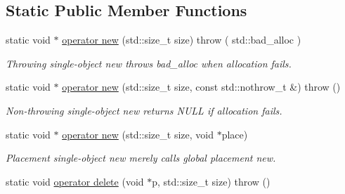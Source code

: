 \subsection*{Static Public Member Functions}
\begin{DoxyCompactItemize}
\item 
\hypertarget{classLoki_1_1SmallObjectBase_a39f9c8d5b17c09bece34c8a400981970}{}static void $\ast$ \hyperlink{classLoki_1_1SmallObjectBase_a39f9c8d5b17c09bece34c8a400981970}{operator new} (std\+::size\+\_\+t size)  throw ( std\+::bad\+\_\+alloc )\label{classLoki_1_1SmallObjectBase_a39f9c8d5b17c09bece34c8a400981970}

\begin{DoxyCompactList}\small\item\em Throwing single-\/object new throws bad\+\_\+alloc when allocation fails. \end{DoxyCompactList}\item 
\hypertarget{classLoki_1_1SmallObjectBase_ad212efa68b48292bf8fd2dd158b49400}{}static void $\ast$ \hyperlink{classLoki_1_1SmallObjectBase_ad212efa68b48292bf8fd2dd158b49400}{operator new} (std\+::size\+\_\+t size, const std\+::nothrow\+\_\+t \&)  throw ()\label{classLoki_1_1SmallObjectBase_ad212efa68b48292bf8fd2dd158b49400}

\begin{DoxyCompactList}\small\item\em Non-\/throwing single-\/object new returns N\+U\+L\+L if allocation fails. \end{DoxyCompactList}\item 
\hypertarget{classLoki_1_1SmallObjectBase_adbbe1bde0960a38502af0940004d942f}{}static void $\ast$ \hyperlink{classLoki_1_1SmallObjectBase_adbbe1bde0960a38502af0940004d942f}{operator new} (std\+::size\+\_\+t size, void $\ast$place)\label{classLoki_1_1SmallObjectBase_adbbe1bde0960a38502af0940004d942f}

\begin{DoxyCompactList}\small\item\em Placement single-\/object new merely calls global placement new. \end{DoxyCompactList}\item 
\hypertarget{classLoki_1_1SmallObjectBase_a698e8b9ebac9df8c03e557c842a59bc5}{}static void \hyperlink{classLoki_1_1SmallObjectBase_a698e8b9ebac9df8c03e557c842a59bc5}{operator delete} (void $\ast$p, std\+::size\+\_\+t size)  throw ()\label{classLoki_1_1SmallObjectBase_a698e8b9ebac9df8c03e557c842a59bc5}


\end{DoxyCompactItemize}
